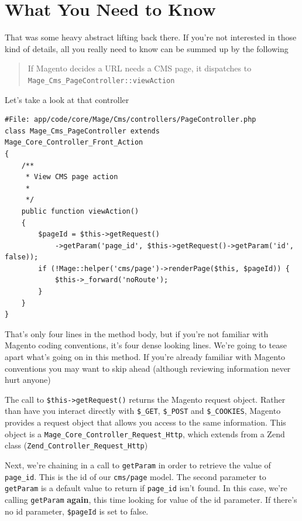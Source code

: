 \documentclass[oneside]{book}
\begin{document}
\section{What You \textbf{Need} to Know}

That was some heavy abstract lifting back there.  If you're not interested in those kind of details, all you really need to know can be summed up by the following

\begin{quote}
If Magento decides a URL needs a CMS page, it dispatches to \footnotesize\texttt{Mage\_Cms\_PageController::viewAction} \normalsize 
\end{quote}

Let's take a look at that controller

\begin{lstlisting}
#File: app/code/core/Mage/Cms/controllers/PageController.php
class Mage_Cms_PageController extends Mage_Core_Controller_Front_Action
{
    /**
     * View CMS page action
     *
     */
    public function viewAction()
    {
        $pageId = $this->getRequest()
            ->getParam('page_id', $this->getRequest()->getParam('id', false));
        if (!Mage::helper('cms/page')->renderPage($this, $pageId)) {
            $this->_forward('noRoute');
        }
    }
}   

\end{lstlisting}


That's only four lines in the method body, but if you're not familiar with Magento coding conventions, it's four dense looking lines.  We're going to tease apart what's going on in this method. If you're already familiar with Magento conventions you may want to skip ahead (although reviewing information never hurt anyone)

The call to \footnotesize\texttt{\$this-\textgreater getRequest()} \normalsize  returns the Magento request object.  Rather than have you interact directly with \footnotesize\texttt{\$\_GET}\normalsize, \footnotesize\texttt{\$\_POST} \normalsize  and \footnotesize\texttt{\$\_COOKIES}\normalsize, Magento provides a request object that allows you access to the same information.  This object is a \footnotesize\texttt{Mage\_Core\_Controller\_Request\_Http}\normalsize, which extends from a Zend class (\footnotesize\texttt{Zend\_Controller\_Request\_Http}\normalsize)

Next, we're chaining in a call to \footnotesize\texttt{getParam} \normalsize  in order to retrieve the value of \footnotesize\texttt{page\_id}\normalsize.  This is the id of our \footnotesize\texttt{cms/page} \normalsize  model.  The second parameter to \footnotesize\texttt{getParam} \normalsize  is a default value to return if \footnotesize\texttt{page\_id} \normalsize  isn't found.  In this case, we're calling \footnotesize\texttt{getParam} \normalsize  \textbf{again}, this time looking for value of the id parameter.  If there's no id parameter, \footnotesize\texttt{\$pageId} \normalsize  is set to false. 
\end{document}
